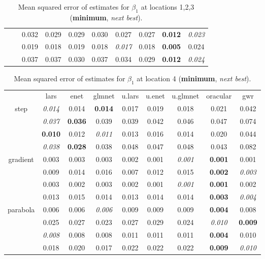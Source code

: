 \documentclass[authoryear, review, 11pt]{elsarticle}
\begin{document}
\begin{table}[ht]
\begin{center}
\begin{tabular}{cccccccccc}
		  & & 0.032 & 0.029 & 0.029 & 0.030 & 0.027 & 0.027 & \textbf{0.012} & \emph{0.023} \\ 
		  & & 0.019 & 0.018 & 0.019 & 0.018 & \emph{0.017} & 0.018 & \textbf{0.005} & 0.024 \\ 
		  & & 0.037 & 0.037 & 0.030 & 0.037 & 0.034 & 0.029 & \textbf{0.012} & \emph{0.024} \\ 
		  \end{tabular}
		\caption{Mean squared error of estimates for $\beta_1$ at locations 1,2,3 (\textbf{minimum}, \emph{next best}).\label{table:loc1-X1-MSEX}}
		\end{center}
		\end{table}
						
		\begin{table}[ht]
		\begin{center}
		\begin{tabular}{ccccccccc}
		  & lars & enet & glmnet & u.lars & u.enet & u.glmnet & oracular & gwr \\ 
		  \cline{2-9}
		  \multirow{4}{*}{step} & \emph{0.014} & 0.014 & \textbf{0.014} & 0.017 & 0.019 & 0.018 & 0.021 & 0.042 \\ 
		  & \emph{0.037} & \textbf{0.036} & 0.039 & 0.039 & 0.042 & 0.046 & 0.047 & 0.074 \\ 
		  & \textbf{0.010} & 0.012 & \emph{0.011} & 0.013 & 0.016 & 0.014 & 0.020 & 0.044 \\ 
		  & \emph{0.038} & \textbf{0.028} & 0.038 & 0.048 & 0.047 & 0.048 & 0.043 & 0.082 \\ 
		  \cline{2-9}
		  \multirow{4}{*}{gradient} & 0.003 & 0.003 & 0.003 & 0.002 & 0.001 & \emph{0.001} & \textbf{0.001} & 0.001 \\ 
		  & 0.009 & 0.014 & 0.016 & 0.007 & 0.012 & 0.015 & \textbf{0.002} & \emph{0.003} \\ 
		  & 0.003 & 0.002 & 0.003 & 0.002 & 0.001 & \emph{0.001} & \textbf{0.001} & 0.002 \\ 
		  & 0.013 & 0.015 & 0.014 & 0.013 & 0.014 & 0.014 & \textbf{0.003} & \emph{0.004} \\ 
		  \cline{2-9}
		  \multirow{4}{*}{parabola} & 0.006 & 0.006 & \emph{0.006} & 0.009 & 0.009 & 0.009 & \textbf{0.004} & 0.008 \\ 
		  & 0.025 & 0.027 & 0.023 & 0.027 & 0.029 & 0.024 & \emph{0.010} & \textbf{0.009} \\ 
		  & \emph{0.008} & 0.008 & 0.008 & 0.011 & 0.011 & 0.011 & \textbf{0.004} & 0.010 \\ 
		  & 0.018 & 0.020 & 0.017 & 0.022 & 0.022 & 0.022 & \textbf{0.009} & \emph{0.010} \\ 
		  \end{tabular}
		\caption{Mean squared error of estimates for $\beta_1$ at location 4 (\textbf{minimum}, \emph{next best}).\label{table:loc4-X1-MSEX}}
		\end{center}
		\end{table}
		
\end{document}
